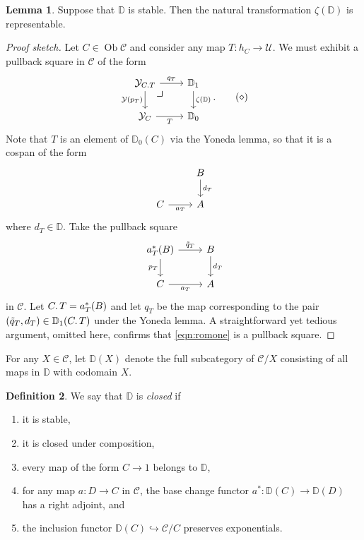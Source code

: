 \documentclass[10pt,letterpaper,cm]{nupset}
\theoremstyle{definition}
\newtheorem{definition}{Definition}[subsection]
\theoremstyle{theorem}
\newtheorem{lemma}[definition]{Lemma}
\theoremstyle{remark}
\DeclareMathOperator{\ob}{Ob}
\newcommand{\0}{\mathbf{0}}
\newcommand{\1}{\mathbf{1}}
\newcommand{\2}{\mathbf{2}}
\renewcommand{\c}{\mathscr{C}}
\newcommand{\be}{\begin{enumerate}}
\newcommand{\ee}{\end{enumerate}}
\begin{document}
\begin{lemma}
Suppose that $\mathbb{D}$ is stable. Then the natural transformation $\zeta(\mathbb{D})$ is representable.
\end{lemma}
\begin{proof}[Proof sketch]
Let $C\in \ob{\c}$ and consider any map $T: h_C \to \mathcal{U}$. We must exhibit a pullback square in $\widehat{\c}$ of the form
\[ \label{eqn:romone}
\begin{tikzcd}
\mathcal{Y}_{C\ldotp{T}} \arrow[d, "\mathcal{Y}(p_T)"'] \arrow[r, "q_T"]  \arrow[dr, phantom, "\scalebox{1.5}{\color{black}$\lrcorner$}" , very near start, color=black] & \mathbb{D}_1 \arrow[d, "\zeta(\mathbb{D})"] \\
\mathcal{Y}_C \arrow[r, "T"']                                                & \mathbb{D}_0                               
\end{tikzcd}
. \tag{$\diamond$}
\] Note that $T$ is an element of $\mathbb{D}_0(C)$ via the Yoneda lemma, so that it is a cospan of the form
\[
\begin{tikzcd}
                  & B \arrow[d, "d_T"] \\
C \arrow[r, "a_T"'] & A               
\end{tikzcd}
\] where $d_T\in \mathbb{D}$. Take the pullback square
\[
\begin{tikzcd}
a_T^{\ast}(B) \arrow[d, "{p}_T"'] \arrow[r, "\tilde{q}_T"] & B \arrow[d, "d_T"] \\
C \arrow[r, "a_T"']                                      & A                 
\end{tikzcd}
\]
in $\c$. Let $C\ldotp{T} = a_T^{\ast}(B)$ and let $q_T$ be the map corresponding to the pair $\left(\tilde{q}_T,  d_T\right) \in \mathbb{D}_1(C\ldotp{T})$ under the Yoneda lemma. A straightforward yet tedious argument, omitted here, confirms that \eqref{eqn:romone} is a pullback square.
\end{proof}

\medskip

For any $X\in \c$, let $\mathbb{D}(X)$ denote the full subcategory of $\c/X$ consisting of all maps in $\mathbb{D}$ with codomain $X$.

\begin{definition}\label{closedmaps}
We say that $\mathbb{D}$ is \textit{closed} if 
\be[label=(\alph*)]
\item it is stable,
\item it is closed under composition,
\item every map of the form $C \to 1$ belongs to $\mathbb{D}$,
\item for any map $a: D \to C$ in $\c$, the base change functor $a^{\ast} : \mathbb{D}(C)\to \mathbb{D}(D)$ has a right adjoint, and
\item the inclusion functor $\mathbb{D}(C) \hookrightarrow \c/C$ preserves exponentials.  
\ee
\end{definition}
\end{document}
